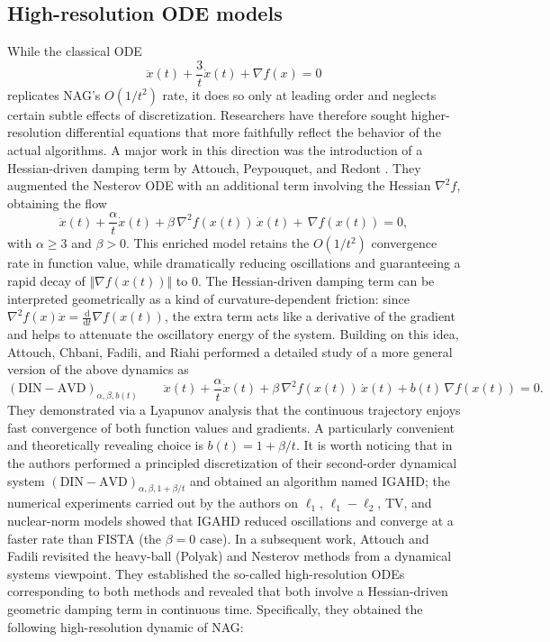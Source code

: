 \documentclass[11pt]{article}
\numberwithin{equation}{section}
\begin{document}
\subsection{High-resolution ODE models} While the classical ODE $$\ddot{x}(t) + \frac{3}{t}\dot{x}(t) + \nabla f(x) = 0$$ replicates NAG’s $O(1/t^2)$ rate, it does so only at {leading order} and neglects certain subtle effects of discretization. Researchers have therefore sought {higher-resolution} differential equations that more faithfully reflect the behavior of the actual algorithms. A major work in this direction was the introduction of a {Hessian-driven damping} term by Attouch, Peypouquet, and Redont \cite{AttouchPeyp2016}. They augmented the Nesterov ODE with an additional term involving the Hessian $\nabla^2 f$, obtaining the flow 
\[
\ddot x(t)+\frac{\alpha}{t}\dot x(t)+\beta\,\nabla^2 f(x(t))\,\dot x(t)+\,\nabla f(x(t))=0,
\]
with $\alpha \ge 3$ and $\beta>0$. This enriched model retains the $O(1/t^2)$ convergence rate in function value, while dramatically reducing oscillations and guaranteeing a rapid decay of $\Vert\nabla f(x(t))\Vert$ to $0$. The Hessian-driven damping term can be interpreted geometrically as a kind of curvature-dependent friction: since $\nabla^2 f(x)\dot{x} = \frac{\mathrm{d}}{\mathrm{d}t}\nabla f(x(t))$, the extra term acts like a derivative of the gradient and helps to attenuate the oscillatory energy of the system. Building on this idea, Attouch, Chbani, Fadili, and Riahi performed a detailed study of a more general version of the above dynamics \cite{AttouchChbani2022} as
\[
\mathrm{(DIN\!-\!AVD)}_{\alpha,\beta,b(t)}\qquad
\ddot x(t)+\frac{\alpha}{t}\dot x(t)+\beta\,\nabla^2 f(x(t))\,\dot x(t)+b(t)\,\nabla f(x(t))=0.
\]
They demonstrated via a Lyapunov analysis that the continuous trajectory enjoys fast convergence of both function values and gradients. A particularly convenient and theoretically revealing choice is \(b(t)=1+\beta/t\). It is worth noticing that in \cite{AttouchChbani2022} the authors  performed a principled discretization of their second-order dynamical system \(\mathrm{(DIN\!-\!AVD)}_{\alpha,\beta,1+\beta/t}\) and obtained an algorithm named {IGAHD}; the numerical experiments carried out by the authors on \(\ell_1\), \(\ell_1\!-\!\ell_2\), TV, and nuclear-norm models showed that IGAHD reduced oscillations and converge at a faster rate than FISTA (the \(\beta=0\) case). In a subsequent work, Attouch and Fadili \cite{AttouchFadili2022} revisited the heavy-ball (Polyak) and Nesterov methods from a dynamical systems viewpoint. They established the so-called high-resolution ODEs corresponding to both methods and revealed that {both} involve a Hessian-driven geometric damping term in continuous time. Specifically, they obtained the following high-resolution dynamic of NAG:
\end{document}
